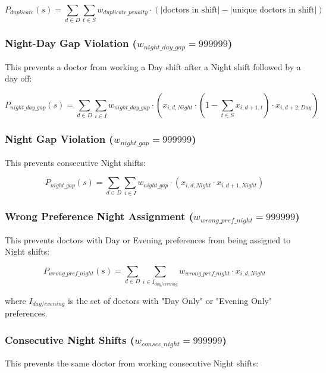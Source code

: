 \documentclass[12pt]{article}
\begin{document}
\begin{equation}
P_{duplicate}(s) = \sum_{d \in D} \sum_{t \in S} w_{duplicate\_penalty} \cdot (|\text{doctors in shift}| - |\text{unique doctors in shift}|)
\end{equation}

\subsubsection{Night-Day Gap Violation ($w_{night\_day\_gap} = 999999$)}
This prevents a doctor from working a Day shift after a Night shift followed by a day off:

\begin{equation}
P_{night\_day\_gap}(s) = \sum_{d \in D} \sum_{i \in I} w_{night\_day\_gap} \cdot (x_{i,d,Night} \cdot (1-\sum_{t \in S}x_{i,d+1,t}) \cdot x_{i,d+2,Day})
\end{equation}

\subsubsection{Night Gap Violation ($w_{night\_gap} = 999999$)}
This prevents consecutive Night shifts:

\begin{equation}
P_{night\_gap}(s) = \sum_{d \in D} \sum_{i \in I} w_{night\_gap} \cdot (x_{i,d,Night} \cdot x_{i,d+1,Night})
\end{equation}

\subsubsection{Wrong Preference Night Assignment ($w_{wrong\_pref\_night} = 999999$)}
This prevents doctors with Day or Evening preferences from being assigned to Night shifts:

\begin{equation}
P_{wrong\_pref\_night}(s) = \sum_{d \in D} \sum_{i \in I_{day/evening}} w_{wrong\_pref\_night} \cdot x_{i,d,Night}
\end{equation}

where $I_{day/evening}$ is the set of doctors with "Day Only" or "Evening Only" preferences.

\subsubsection{Consecutive Night Shifts ($w_{consec\_night} = 999999$)}
This prevents the same doctor from working consecutive Night shifts:
\end{document}

